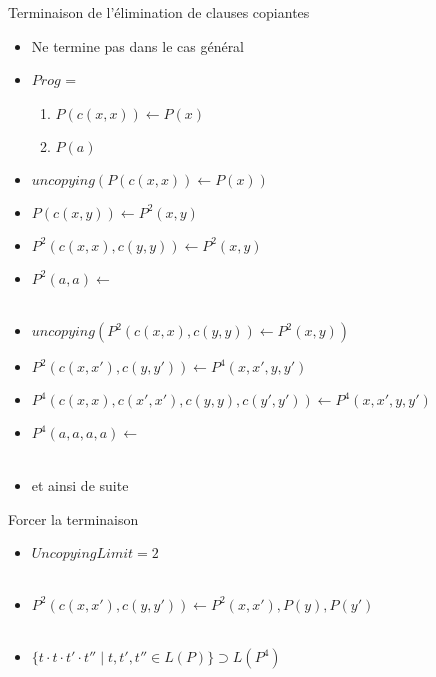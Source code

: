 \begin{frame}{Terminaison de l'élimination de clauses copiantes}
  \begin{itemize}[<+->]
  \item Ne termine pas dans le cas général
  \item $Prog$ =
    \begin{enumerate}
    \item {}$P(c(x,x)) \leftarrow P(x)$
    \item {}$P(a)$
    \end{enumerate}
    \vspace{\baselineskip}

  \item $uncopying(P(c(x,x)) \leftarrow P(x))$
  \item $P(c(x,y)) \leftarrow P^2(x, y)$
  \item {}$P^2(c(x,x),c(y,y)) \leftarrow P^2(x,y)$
  \item {}$P^2(a,a) \leftarrow $ \\~

  \item $uncopying(P^2(c(x,x), c(y,y)) \leftarrow P^2(x,y))$
  \item $P^2(c(x,x'), c(y,y')) \leftarrow P^4(x, x', y, y')$
  \item $P^4(c(x,x),c(x',x'),c(y,y),c(y',y')) \leftarrow P^4(x,x',y,y')$
  \item $P^4(a,a,a,a) \leftarrow $ \\~

  \item et ainsi de suite
  \end{itemize}
    
\end{frame}

\begin{frame}{Forcer la terminaison}
  \begin{itemize}[<+->]
  \item $UncopyingLimit = 2$ \\~

  \item $P^2(c(x,x'), c(y,y')) \leftarrow P^2(x, x'), P(y), P(y')$ \\~

  \item $\{ t \cdot t \cdot t' \cdot t'' \mid t, t', t'' \in L(P) \} \supset L(P^4)$
  \end{itemize}
\end{frame}